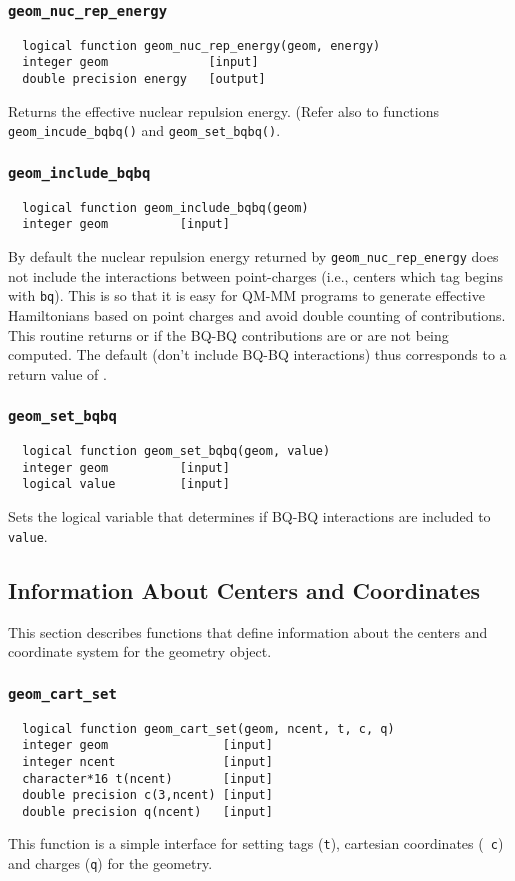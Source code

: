 \subsubsection{{\tt geom\_nuc\_rep\_energy}}
\begin{verbatim}
  logical function geom_nuc_rep_energy(geom, energy)
  integer geom              [input]
  double precision energy   [output]
\end{verbatim}
Returns the effective nuclear repulsion energy.  (Refer also to functions
\verb+geom_incude_bqbq()+  and
\verb+geom_set_bqbq()+.

\subsubsection{{\tt geom\_include\_bqbq}}
\label{sec:incbqbq}
\begin{verbatim}
  logical function geom_include_bqbq(geom)
  integer geom          [input]
\end{verbatim}
By default the nuclear repulsion energy returned by
\verb+geom_nuc_rep_energy+ does not include the interactions between
point-charges (i.e., centers which tag begins with \verb+bq+).  This
is so that it is easy for QM-MM programs to generate effective
Hamiltonians based on point charges and avoid double counting of
contributions.  This routine returns \TRUE or \FALSE
if the BQ-BQ contributions are or are not being computed.  The default
(don't include BQ-BQ interactions) thus corresponds to a return value
of \FALSE.

\subsubsection{{\tt geom\_set\_bqbq}}
\label{sec:setbqbq}
\begin{verbatim}
  logical function geom_set_bqbq(geom, value)
  integer geom          [input]
  logical value         [input]
\end{verbatim}
Sets the logical variable that determines if BQ-BQ interactions are
included to {\tt value}.

\subsection{Information About Centers and Coordinates}

This section describes functions that define information about the
centers and coordinate system for the geometry object.

\subsubsection{{\tt geom\_cart\_set}}
\begin{verbatim}
  logical function geom_cart_set(geom, ncent, t, c, q)
  integer geom                [input]
  integer ncent               [input]
  character*16 t(ncent)       [input]
  double precision c(3,ncent) [input]
  double precision q(ncent)   [input]
\end{verbatim}
This function is a simple interface for setting tags ({\tt t}), 
cartesian coordinates ({\tt
  c}) and charges ({\tt q}) for the geometry.

